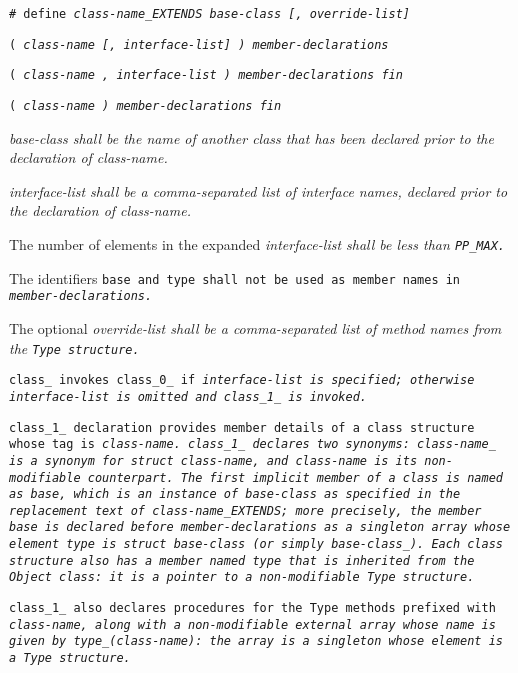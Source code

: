 
\tt{# define} \it{class-name}\tt{_EXTENDS}
\it{base-class} [\tt{,} \it{override-list}]

\s\s\s\tt{(} \it{class-name} [\tt{,}
\it{interface-list}] \tt{)} \it{member-declarations} 

\s\tt{(} \it{class-name} \phantom{[}\tt{,}
\it{interface-list}\phantom{]}  \tt{)} \it{member-declarations} \tt{fin}

\s\tt{(} \it{class-name} \tt{)} \it{member-declarations} \tt{fin}


\it{base-class} shall be the name of another class that has
 been  declared prior to the declaration of \it{class-name}.

\it{interface-list} shall be a comma-separated list of interface
names, declared prior to the declaration of \it{class-name}.

The number of elements in the expanded
\it{interface-list} shall be less than \tt{PP_MAX}.

The identifiers \tt{base} and \tt{type} shall not be
used as member names in \it{member-declarations}.

The optional \it{override-list} shall be a comma-separated
list of method names from the \tt{Type} structure.


\tt{class_} invokes \tt{class_0_} if \it{interface-list} is specified;
otherwise \it{interface-list} is omitted and \tt{class_1_} is invoked.

\tt{class_1_} declaration provides member details
of a class structure whose tag is \it{class-name}.
\tt{class_1_} declares two synonyms: \it{class-name}\_ is a synonym for
\tt{struct} \it{class-name}, and \it{class-name} is its non-modifiable counterpart.
The first implicit member of a class is named as \tt{base}, which is
an instance of \it{base-class} as specified in the replacement text
of \it{class-name}\tt{_EXTENDS}; more precisely, the member \tt{base}
is declared before \it{member-declarations} as a singleton array whose
element type is \tt{struct} \it{base-class} (or simply \it{base-class}\_).
Each class structure also has a member named \tt{type} that is inherited from
the \tt{Object} class: it is a pointer to a non-modifiable \tt{Type} structure.

\tt{class_1_} also declares procedures for the \tt{Type} methods
prefixed with \it{class-name}, along with a non-modifiable external
array whose name is given by \tt{type_(}\it{class-name}\tt{)}:
the array is a singleton whose element is a \tt{Type} structure.

